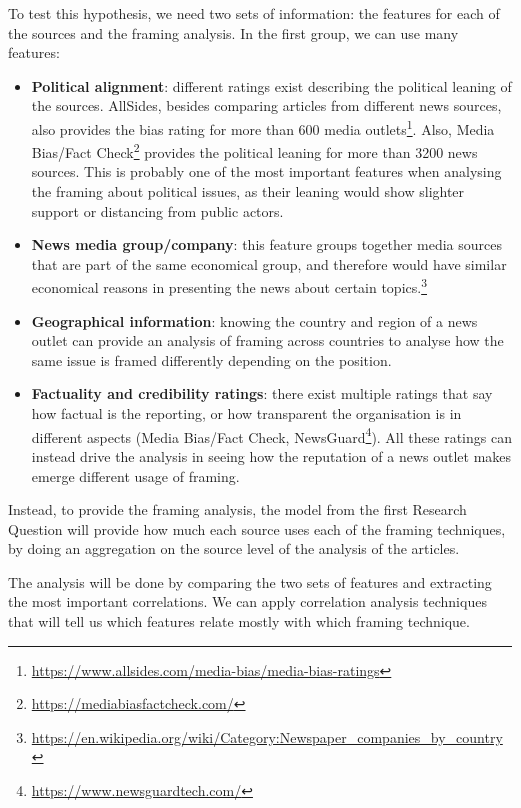 To test this hypothesis, we need two sets of information: the features for each of the sources and the framing analysis.
In the first group, we can use many features:

\begin{itemize}
    \item \textbf{Political alignment}: different ratings exist describing the political leaning of the sources. AllSides, besides comparing articles from different news sources, also provides the bias rating for more than 600 media outlets\footnote{\url{https://www.allsides.com/media-bias/media-bias-ratings}}. Also, Media Bias/Fact Check\footnote{\url{https://mediabiasfactcheck.com/}} provides the political leaning for more than 3200 news sources. This is probably one of the most important features when analysing the framing about political issues, as their leaning would show slighter support or distancing from public actors.
    \item \textbf{News media group/company}: this feature groups together media sources that are part of the same economical group, and therefore would have similar economical reasons in presenting the news about certain topics.\footnote{\url{https://en.wikipedia.org/wiki/Category:Newspaper_companies_by_country}} %
    \item \textbf{Geographical information}: knowing the country and region of a news outlet can provide an analysis of framing across countries to analyse how the same issue is framed differently depending on the position.
    \item \textbf{Factuality and credibility ratings}: there exist multiple ratings that say how factual is the reporting, or how transparent the organisation is in different aspects (Media Bias/Fact Check, NewsGuard\footnote{\url{https://www.newsguardtech.com/}}). All these ratings can instead drive the analysis in seeing how the reputation of a news outlet makes emerge different usage of framing.
\end{itemize}

Instead, to provide the framing analysis, the model from the first Research Question will provide how much each source uses each of the framing techniques, by doing an aggregation on the source level of the analysis of the articles.

The analysis will be done by comparing the two sets of features and extracting the most important correlations.
We can apply correlation analysis techniques that will tell us which features relate mostly with which framing technique. 

